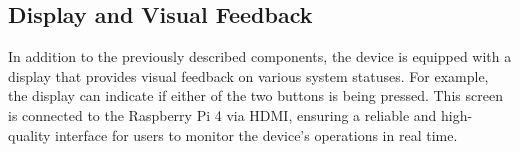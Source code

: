 \subsection{Display and Visual Feedback}  
In addition to the previously described components, the device is equipped with a display that provides visual feedback on various system statuses. For example, the display can indicate if either of the two buttons is being pressed. This screen is connected to the Raspberry Pi 4 via HDMI, ensuring a reliable and high-quality interface for users to monitor the device’s operations in real time.